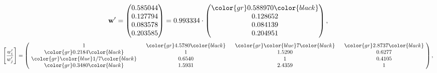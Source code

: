 \begin{example}
\begin{equation*}
\mathbf{w}^{\prime} =
\begin{pmatrix}
0.585044\\
0.127794\\
0.083578\\
0.203585
\end{pmatrix} =
0.993334\cdot
\begin{pmatrix}
\color{gr} 0.588970\color{black} \\
0.128652\\
0.084139\\
0.204951
\end{pmatrix},
\end{equation*}
\begin{equation*}
\left[ \frac{{w}^{\prime}_i}{{w}^{\prime}_j} \right] =
\begin{pmatrix}
$\,\,$ 1 $\,\,$ & $\,\,$\color{gr} 4.5780\color{black} $\,\,$ & $\,\,$\color{gr} \color{blue} 7\color{black} $\,\,$ & $\,\,$\color{gr} 2.8737\color{black} $\,\,$ \\
$\,\,$\color{gr} 0.2184\color{black} $\,\,$ & $\,\,$ 1 $\,\,$ & $\,\,$1.5290$\,\,$ & $\,\,$0.6277  $\,\,$ \\
$\,\,$\color{gr} \color{blue}  1/7\color{black} $\,\,$ & $\,\,$0.6540$\,\,$ & $\,\,$ 1 $\,\,$ & $\,\,$0.4105 $\,\,$ \\
$\,\,$\color{gr} 0.3480\color{black} $\,\,$ & $\,\,$1.5931$\,\,$ & $\,\,$2.4359$\,\,$ & $\,\,$ 1  $\,\,$ \\
\end{pmatrix},
\end{equation*}
\end{example}
\newpage
